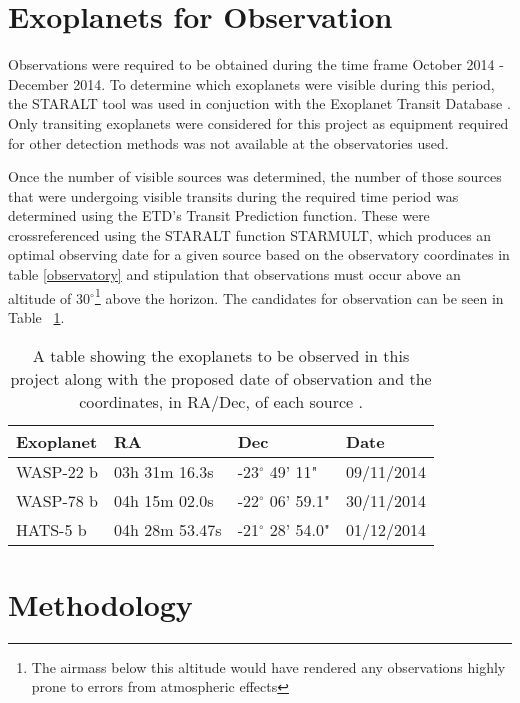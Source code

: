 \documentclass[twoside]{article}
\begin{document}
\begin{multicols}{2}
\section{Exoplanets for Observation}
Observations were required to be obtained during the time frame October 2014 - December 2014. To determine which exoplanets were visible during this period, the STARALT tool \citep{staralt} was used in conjuction with the Exoplanet Transit Database \citep{etd}. Only transiting exoplanets were considered for this project as equipment required for other detection methods was not available at the observatories used. 

Once the number of visible sources was determined, the number of those sources that were undergoing visible transits during the required time period was determined using the ETD's Transit Prediction function. These were crossreferenced using the STARALT function STARMULT, which produces an optimal observing date for a given source based on the observatory coordinates in table \ref{observatory} and stipulation that observations must occur above an altitude of 30$^\circ$\footnote{The airmass below this altitude would have rendered any observations highly prone to errors from atmospheric effects} above the horizon. The candidates for observation can be seen in Table ~\ref{planets}.

\begin{table}[H]
    \centering
    \begin{tabular}{ | l | l | l | l | }
    \hline \hline
    Exoplanet & RA & Dec & Date       \\ \hline \hline
    WASP-22 b    & 03h 31m 16.3s & -23$^\circ$ 49' 11" & 09/11/2014 \\
    WASP-78 b   & 04h 15m 02.0s & -22$^\circ$ 06' 59.1" & 30/11/2014 \\
    HATS-5 b  & 04h 28m 53.47s & -21$^\circ$ 28' 54.0" & 01/12/2014 \\
    \hline
    \end{tabular}
    \caption{A table showing the exoplanets to be observed in this project along with the proposed date of observation and the coordinates, in RA/Dec, of each source \citep{etd}.}
    \label{planets}
\end{table}


\section{Methodology}

\end{multicols}
\end{document}
